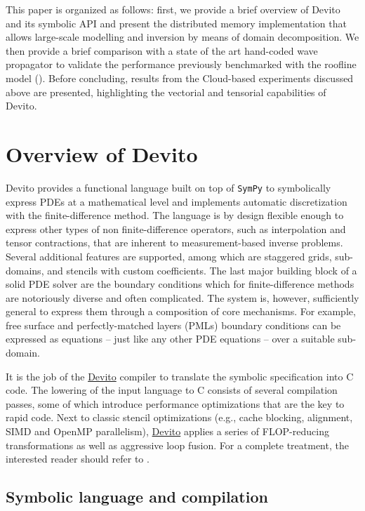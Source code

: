 \documentclass[10pt, conference]{IEEEtran}
\newcommand{\devito}{\href{https://github.com/devitocodes/devito}{Devito} }
\begin{document}
This paper is organized as follows: first, we provide a brief overview of
Devito and its symbolic API and present the distributed memory
implementation that allows large-scale modelling and inversion by means of
domain decomposition. We then provide a brief comparison with a state of
the art hand-coded wave propagator to validate the performance previously
benchmarked with the roofline model (\cite{patterson, devito-compiler,
devito-api, louboutin2016ppf}).  Before concluding, results from the
Cloud-based experiments discussed above are presented, highlighting the
vectorial and tensorial capabilities of Devito.

\section{Overview of Devito}\label{overview-of-devito}

Devito \cite{devito-api} provides a functional language built on top of
\texttt{SymPy} \cite{sympy} to symbolically express PDEs at a
mathematical level and implements automatic discretization with the
finite-difference method. The language is by design flexible enough to
express other types of non finite-difference operators, such as
interpolation and tensor contractions, that are inherent to
measurement-based inverse problems. Several additional features are
supported, among which are staggered grids, sub-domains, and stencils with
custom coefficients. The last major building block of a solid PDE solver
are the boundary conditions which for finite-difference methods are
notoriously diverse and often complicated. The system is, however,
sufficiently general to express them through a composition of core
mechanisms. For example, free surface and perfectly-matched layers
(PMLs) boundary conditions can be expressed as equations -- just like
any other PDE equations -- over a suitable sub-domain.

It is the job of the \devito compiler to translate the symbolic specification
into C code. The lowering of the input language to C consists of
several compilation passes, some of which introduce performance
optimizations that are the key to rapid code. Next to classic stencil
optimizations (e.g., cache blocking, alignment, SIMD and OpenMP
parallelism), \devito applies a series of FLOP-reducing transformations as
well as aggressive loop fusion. For a complete treatment, the interested
reader should refer to \cite{devito-compiler}.

\subsection{Symbolic language and
compilation}\label{symbolic-language-and-compilation}
\end{document}
